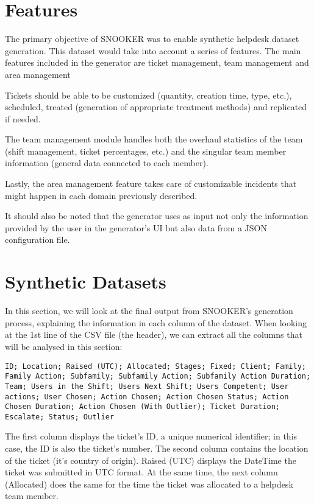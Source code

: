 \section{Features}
The primary objective of SNOOKER was to enable synthetic helpdesk dataset generation. This dataset would take into account a series of features. The main features included in the generator are ticket management, team management and area management

Tickets should be able to be customized (quantity, creation time, type, etc.), scheduled, treated (generation of appropriate treatment methods) and replicated if needed. 

The team management module handles both the overhaul statistics of the team (shift management, ticket percentages, etc.) and the singular team member information (general data connected to each member).

Lastly, the area management feature takes care of customizable incidents that might happen in each domain previously described.

It should also be noted that the generator uses as input not only the information provided by the user in the generator's UI but also data from a JSON configuration file.

\section{Synthetic Datasets}
In this section, we will look at the final output from SNOOKER's generation process, explaining the information in each column of the dataset. When looking at the 1st line of the CSV file (the header), we can extract all the columns that will be analysed in this section:
\begin{lstlisting}[breaklines=true]
  ID; Location; Raised (UTC); Allocated; Stages; Fixed; Client; Family; Family Action; Subfamily; Subfamily Action; Subfamily Action Duration; Team; Users in the Shift; Users Next Shift; Users Competent; User actions; User Chosen; Action Chosen; Action Chosen Status; Action Chosen Duration; Action Chosen (With Outlier); Ticket Duration; Escalate; Status; Outlier

\end{lstlisting}

The first column displays the ticket's ID, a unique numerical identifier; in this case, the ID is also the ticket's number. The second column contains the location of the ticket (it's country of origin). Raised (UTC) displays the DateTime the ticket was submitted in UTC format. At the same time, the next column (Allocated) does the same for the time the ticket was allocated to a helpdesk team member. 

